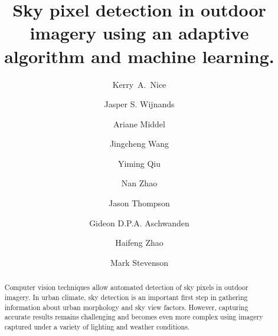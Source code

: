 \documentclass[final,3p,times,authoryear]{elsarticle}
\begin{document}
% 


\begin{frontmatter}



\title{Sky pixel detection in outdoor imagery using an adaptive algorithm and machine learning.}

\author[melb,monash,crc]{Kerry~A.~Nice}
\author[melb]{Jasper S. Wijnands}
\author[asu]{Ariane Middel}
\author[cis]{Jingcheng Wang}
\author[cis]{Yiming Qiu}
\author[cis]{Nan Zhao}
\author[melb]{Jason Thompson}
\author[melb]{Gideon D.P.A. Aschwanden}
\author[melb]{Haifeng Zhao}
\author[melb,eng]{Mark Stevenson}
\address[melb]{Transport, Health, and Urban Design Hub, Faculty of Architecture, Building, and Planning, University of Melbourne, Victoria 3010, Australia}
\address[cis]{School of Computing and Information Systems, University of Melbourne, Victoria 3010, Australia}
\address[eng]{Melbourne School of Engineering; and Melbourne School of Population and Global Health, University of Melbourne, Victoria, Australia.}
\address[monash]{School of Earth, Atmosphere and Environment, Monash University, Clayton, VIC 3800, Australia}
\address[crc]{Cooperative Research Centre for Water Sensitive Cities, Melbourne, Australia}
\address[asu]{School of Arts, Media and Engineering (AME), School of Computing, Informatics, and Decision Systems Engineering (CIDSE), Arizona State University}

\begin{abstract}

Computer vision techniques allow automated detection of sky pixels in outdoor imagery. In urban climate, sky detection is an important first step in gathering information about urban morphology and sky view factors. However, capturing accurate results remains challenging and becomes even more complex using imagery captured under a variety of lighting and weather conditions. 


\end{abstract}
\end{frontmatter}
\end{document}
